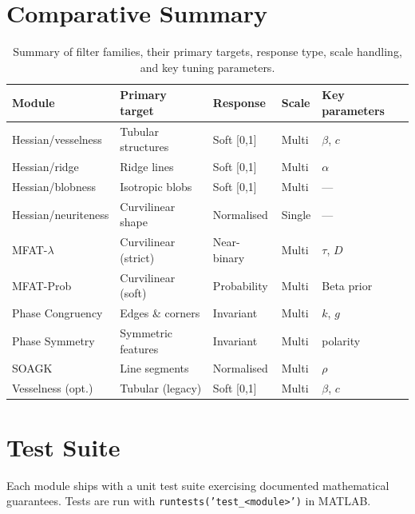 \documentclass[a4paper,justified]{tufte-book}
\begin{document}
\section{Comparative Summary}

\begin{table}[ht]
  \centering
  \footnotesize
  \begin{tabular}{lllll}
    \toprule
    Module & Primary target & Response & Scale & Key parameters \\
    \midrule
    Hessian/vesselness  & Tubular structures   & Soft [0,1]  & Multi & $\beta$, $c$ \\
    Hessian/ridge       & Ridge lines          & Soft [0,1]  & Multi & $\alpha$ \\
    Hessian/blobness    & Isotropic blobs      & Soft [0,1]  & Multi & --- \\
    Hessian/neuriteness & Curvilinear shape    & Normalised  & Single & --- \\
    MFAT-$\lambda$      & Curvilinear (strict) & Near-binary & Multi & $\tau$, $D$ \\
    MFAT-Prob           & Curvilinear (soft)   & Probability & Multi & Beta prior \\
    Phase Congruency    & Edges \& corners     & Invariant   & Multi & $k$, $g$ \\
    Phase Symmetry      & Symmetric features   & Invariant   & Multi & polarity \\
    SOAGK               & Line segments        & Normalised  & Multi & $\rho$ \\
    Vesselness (opt.)   & Tubular (legacy)     & Soft [0,1]  & Multi & $\beta$, $c$ \\
    \bottomrule
  \end{tabular}
  \caption{Summary of filter families, their primary targets, response type,
  scale handling, and key tuning parameters.}
\end{table}

\section{Test Suite}

Each module ships with a unit test suite exercising documented mathematical
guarantees. Tests are run with \texttt{runtests('test\_<module>')} in MATLAB.
\end{document}
